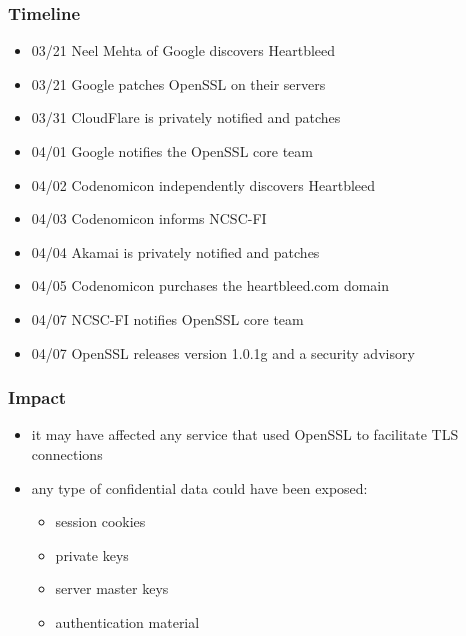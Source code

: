 \documentclass[
    11pt, %
    aspectratio=169, %
]{beamer}
\begin{document}
\begin{frame}
	\frametitle{Timeline}
            \begin{itemize}
                \item 03/21 Neel Mehta of Google discovers Heartbleed
                \item 03/21 Google patches OpenSSL on their servers
                \item 03/31 CloudFlare is privately notified and patches
                \item 04/01 Google notifies the OpenSSL core team
                \item 04/02 Codenomicon independently discovers Heartbleed
                \item 04/03 Codenomicon informs NCSC-FI
                \item 04/04 Akamai is privately notified and patches
                \item 04/05 Codenomicon purchases the heartbleed.com domain
                \item 04/07 NCSC-FI notifies OpenSSL core team
                \item 04/07 OpenSSL releases version 1.0.1g and a security advisory
            \end{itemize}
\end{frame}

\begin{frame}
	\frametitle{Impact}
            \begin{itemize}
                \item it may have affected any service that used OpenSSL to facilitate TLS connections
                \newline
                \newline
                \item any type of confidential data could have been exposed:
                \newline
                    \begin{itemize}
                        \item session cookies
                        \item private keys
                        \item server master keys
                        \item authentication material
                    \end{itemize}
            \end{itemize}
\end{frame}
\end{document}
